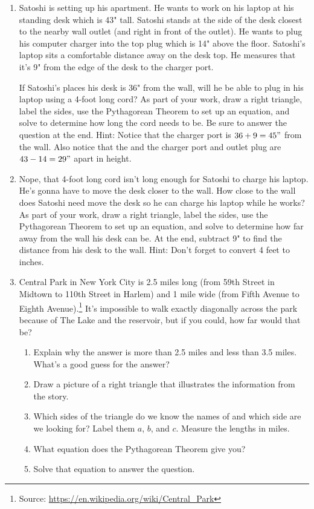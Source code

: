 \begin{enumerate}
\item Satoshi is setting up his apartment.  He wants to work on his laptop at his standing desk which is 43" tall. Satoshi stands at the side of the desk closest to the nearby wall outlet (and right in front of the outlet).  He wants to plug his computer charger into the top plug which is 14" above the floor. Satoshi's laptop sits  a comfortable distance away on the desk top.  He measures that it's 9" from the edge of the desk to the charger port. 

If Satoshi's places his desk is 36" from the wall, will he be able to plug in his laptop using a 4-foot long cord?  As part of your work, draw a right triangle, label the sides, use the Pythagorean Theorem to set up an equation, and solve to determine how long the cord needs to be.  Be sure to answer the question at the end. Hint: Notice that the charger port is $36+9 = 45"$ from the wall.  Also notice that the and the charger port and outlet plug are $43-14 = 29"$ apart in height. %

\item Nope, that 4-foot long cord isn't long enough for Satoshi to charge his laptop.  He's gonna have to move the desk closer to the wall.  How close to the wall does Satoshi need move the desk so he can charge his laptop while he works?  As part of your work, draw a right triangle, label the sides, use the Pythagorean Theorem to set up an equation, and solve to determine how far away from the wall his desk can be.  At the end, subtract 9" to find the distance from his desk to the wall. Hint: Don't forget to convert 4 feet to inches. %


\item Central Park in New York City is 2.5 miles long (from 59th Street in Midtown to 110th Street in Harlem) and 1 mile wide (from Fifth Avenue to Eighth Avenue).\footnote{Source: \url{https://en.wikipedia.org/wiki/Central_Park}} It's impossible to walk exactly diagonally across the park because of The Lake and the reservoir, but if you could, how far would that be?
\begin{enumerate}
    \item Explain why the answer is more than 2.5 miles and less than 3.5 miles.  What's a good guess for the answer?
    \item Draw a picture of a right triangle that illustrates the information from the story.
    \item Which sides of the triangle do we know the names of and which side are we looking for?  Label them $a$, $b$, and $c$.  Measure the lengths in miles.
    \item What equation does the Pythagorean Theorem give you?
    \item Solve that equation to answer the question.
\end{enumerate}


\end{enumerate}
